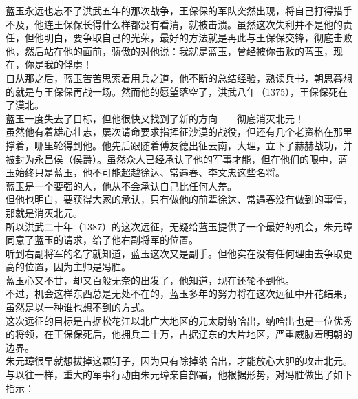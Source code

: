 \begin{multicols}{\theparacolNo}
蓝玉永远也忘不了洪武五年的那次战争，王保保的军队突然出现，将自己打得措手不及，他连王保保长得什么样都没有看清，就被击溃。虽然这次失利并不是他的责任，但他明白，要争取自己的光荣，最好的方法就是再此与王保保交锋，彻底击败他，然后站在他的面前，骄傲的对他说：我就是蓝玉，曾经被你击败的蓝玉，现在，你是我的俘虏！\\

自从那之后，蓝玉苦苦思索着用兵之道，他不断的总结经验，熟读兵书，朝思暮想的就是与王保保再战一场。然而他的愿望落空了，洪武八年（1375），王保保死在了漠北。\\

蓝玉一度失去了目标，但他很快又找到了新的方向——彻底消灭北元！\\

虽然他有着雄心壮志，屡次请命要求指挥征沙漠的战役，但还有几个老资格在那里撑着，哪里轮得到他。他先后跟随着傅友德出征云南，大理，立下了赫赫战功，并被封为永昌侯（侯爵）。虽然众人已经承认了他的军事才能，但在他们的眼中，蓝玉始终只是蓝玉，他不可能超越徐达、常遇春、李文忠这些名将。\\

蓝玉是一个要强的人，他从不会承认自己比任何人差。\\

但他也明白，要获得大家的承认，只有做他的前辈徐达、常遇春没有做到的事情，那就是消灭北元。\\

所以洪武二十年（1387）的这次远征，无疑给蓝玉提供了一个最好的机会，朱元璋同意了蓝玉的请求，给了他右副将军的位置。\\

听到右副将军的名字就知道，蓝玉这次又是副手。但他实在没有任何理由去争取更高的位置，因为主帅是冯胜。\\

蓝玉心又不甘，却又百般无奈的出发了，他知道，现在还轮不到他。\\

不过，机会这样东西总是无处不在的，蓝玉多年的努力将在这次远征中开花结果，虽然是以一种谁也想不到的方式。\\

这次远征的目标是占据松花江以北广大地区的元太尉纳哈出，纳哈出也是一位优秀的将领，在王保保死后，他拥兵二十万，占据辽东的大片地区，严重威胁着明朝的边界。\\

朱元璋很早就想拔掉这颗钉子，因为只有除掉纳哈出，才能放心大胆的攻击北元。\\

与以往一样，重大的军事行动由朱元璋亲自部署，他根据形势，对冯胜做出了如下指示：\\


\end{multicols}
